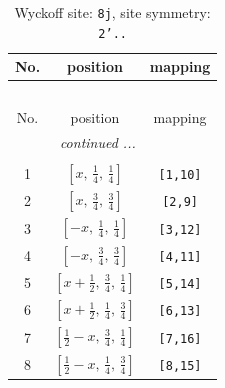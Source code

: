 \documentclass[fleqn,8pt]{jsarticle}
\begin{document}
\begin{longtable}{ccc}
\caption{Wyckoff site: {\tt 8j}, site symmetry: {\tt 2'..}}
 \\
 \hline \hline
No. & position & mapping \\ \hline \endfirsthead

\multicolumn{2}{l}{\tablename\ \thetable{}} \\
 \hline \hline
No. & position & mapping \\ \hline \endhead

 \hline \hline
\multicolumn{2}{r}{\footnotesize\it continued ...} \\ \endfoot

 \hline \hline
\multicolumn{2}{r}{} \\ \endlastfoot

1 & $\left[ x,\, \frac{1}{4},\, \frac{1}{4} \right]$ & {\tt [1,10]} \\ \hline
2 & $\left[ x,\, \frac{3}{4},\, \frac{3}{4} \right]$ & {\tt [2,9]} \\ \hline
3 & $\left[ - x,\, \frac{1}{4},\, \frac{1}{4} \right]$ & {\tt [3,12]} \\ \hline
4 & $\left[ - x,\, \frac{3}{4},\, \frac{3}{4} \right]$ & {\tt [4,11]} \\ \hline
5 & $\left[ x + \frac{1}{2},\, \frac{3}{4},\, \frac{1}{4} \right]$ & {\tt [5,14]} \\ \hline
6 & $\left[ x + \frac{1}{2},\, \frac{1}{4},\, \frac{3}{4} \right]$ & {\tt [6,13]} \\ \hline
7 & $\left[ \frac{1}{2} - x,\, \frac{3}{4},\, \frac{1}{4} \right]$ & {\tt [7,16]} \\ \hline
8 & $\left[ \frac{1}{2} - x,\, \frac{1}{4},\, \frac{3}{4} \right]$ & {\tt [8,15]} \\
\end{longtable}
\renewcommand{\arraystretch}{1.2}
\end{document}

